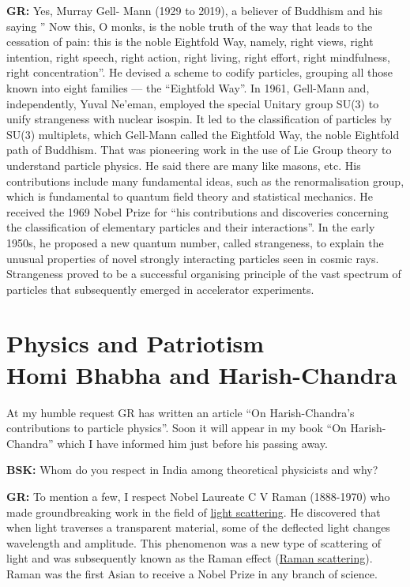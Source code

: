 \textbf{GR:} Yes, Murray Gell- Mann (1929 to 2019), a believer of Buddhism and his saying  ” Now this, O monks, is the noble truth of the way that leads to the cessation of pain: this is the noble Eightfold Way, namely, right views, right intention, right speech, right action, right living, right effort, right mindfulness, right concentration”. He devised a scheme to codify particles, grouping all those known into eight families — the “Eightfold Way”. In 1961, Gell-Mann and, independently, Yuval Ne’eman, employed the special Unitary group SU(3) to unify strangeness with nuclear isospin. It led to the classification of particles by SU(3) multiplets, which Gell-Mann called the Eightfold Way, the noble Eightfold path of Buddhism. That was pioneering work in the use of Lie Group theory to understand particle physics. He said there are many like masons, etc. His contributions include many   fundamental ideas, such as the renormalisation group, which is fundamental to quantum field theory and statistical mechanics.  He received the 1969 Nobel Prize for “his contributions and discoveries concerning the classification of elementary particles and their interactions”. In the early 1950s, he proposed a new quantum number, called strangeness, to explain the unusual properties of novel strongly interacting particles seen in cosmic rays. Strangeness proved to be a successful organising principle of the vast spectrum of particles that subsequently emerged in accelerator experiments.

\section*{Physics and Patriotism\\ {\large Homi Bhabha and Harish-Chandra}}

At my humble request GR has written an article \cite{chap13-key03GR} “On Harish-Chandra's contributions to particle physics”. Soon it will appear in my book “On Harish-Chandra” which I have informed him just before his passing away.

\textbf{BSK:} Whom do you respect in India among theoretical physicists and why?

\textbf{GR:} To mention a few, I respect Nobel Laureate C V Raman (1888-1970) who made groundbreaking work in the field of \underline{light scattering}. He discovered that when light traverses a transparent material, some of the deflected light changes wavelength and amplitude. This phenomenon was a new type of scattering of light and was subsequently known as the Raman effect (\underline{Raman scattering}). Raman was the first Asian to receive a Nobel Prize in any branch of science.

